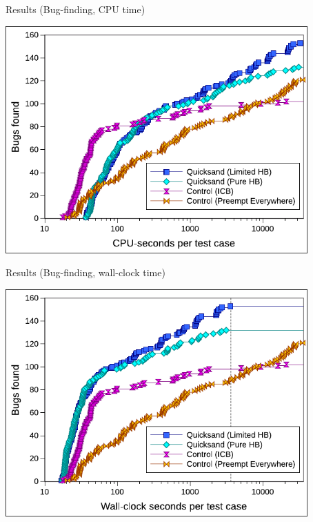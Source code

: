 \documentclass[xcolor=dvipsnames]{beamer}
\begin{document}
\begin{frame}{Results (Bug-finding, CPU time)}
	\begin{center}
	\vspace{-0.8em}
	\includegraphics[width=0.87\textwidth]{bugs-talk.pdf}
	\end{center}
\end{frame}
\begin{frame}{Results (Bug-finding, wall-clock time)}
	\begin{center}
	\vspace{-0.8em}
	\includegraphics[width=0.87\textwidth]{bugs-wallclock-talk.pdf}
	\end{center}
\end{frame}
\end{document}
